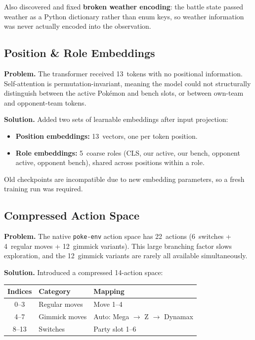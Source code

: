 Also discovered and fixed \textbf{broken weather encoding}: the battle state
passed weather as a Python dictionary rather than enum keys, so weather
information was never actually encoded into the observation.

\subsection{Position \& Role Embeddings}

\textbf{Problem.} The transformer received 13~tokens with no positional
information.  Self-attention is permutation-invariant, meaning the model
could not structurally distinguish between the active Pok\'{e}mon and bench
slots, or between own-team and opponent-team tokens.

\textbf{Solution.} Added two sets of learnable embeddings after input
projection:
\begin{itemize}
  \item \textbf{Position embeddings:} 13~vectors, one per token position.
  \item \textbf{Role embeddings:} 5~coarse roles (CLS, our active, our bench,
        opponent active, opponent bench), shared across positions within a role.
\end{itemize}

Old checkpoints are incompatible due to new embedding parameters, so a fresh
training run was required.

\subsection{Compressed Action Space}

\textbf{Problem.} The native \texttt{poke-env} action space has 22~actions
(6~switches + 4~regular moves + 12~gimmick variants).  This large branching
factor slows exploration, and the 12~gimmick variants are rarely all available
simultaneously.

\textbf{Solution.} Introduced a compressed 14-action space:

\begin{center}
\small
\begin{tabularx}{0.7\textwidth}{c l l}
  \toprule
  \textbf{Indices} & \textbf{Category} & \textbf{Mapping} \\
  \midrule
  0--3  & Regular moves & Move 1--4 \\
  4--7  & Gimmick moves & Auto: Mega $\to$ Z $\to$ Dynamax \\
  8--13 & Switches      & Party slot 1--6 \\
  \bottomrule
\end{tabularx}
\end{center}

